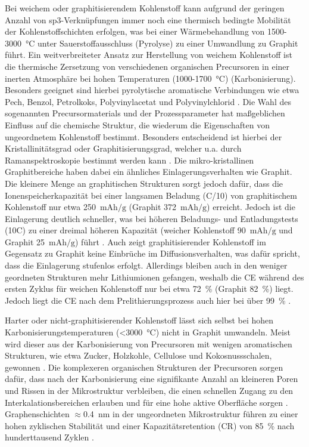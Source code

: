 Bei weichem oder graphitisierendem Kohlenstoff kann aufgrund der geringen Anzahl von sp3-Verknüpfungen immer noch eine thermisch bedingte Mobilität der Kohlenstoffschichten erfolgen, was bei einer Wärmebehandlung von 1500-3000~$\si{\degreeCelsius}$ unter Sauerstoffausschluss (Pyrolyse) zu einer Umwandlung zu Graphit führt. Ein weitverbreiteter Ansatz zur Herstellung von weichem Kohlenstoff ist die thermische Zersetzung von verschiedenen organischen Precursoren in einer inerten Atmosphäre bei hohen Temperaturen (1000-1700~$\si{\degreeCelsius}$) (Karbonisierung). Besonders geeignet sind hierbei pyrolytische aromatische Verbindungen wie etwa Pech, Benzol, Petrolkoks, Polyvinylacetat und Polyvinylchlorid \cite{Wang2021}. Die Wahl des sogenannten Precursormaterials und der Prozessparameter hat maßgeblichen Einfluss auf die chemische Struktur, die wiederum die Eigenschaften von ungeordnetem Kohlenstoff bestimmt. Besonders entscheidend ist hierbei der Kristallinitätsgrad oder Graphitisierungsgrad, welcher u.a. durch Ramanspektroskopie bestimmt werden kann \cite{Yu2014}. Die mikro-kristallinen Graphitbereiche haben dabei ein ähnliches Einlagerungsverhalten wie Graphit. Die kleinere Menge an graphitischen Strukturen sorgt jedoch dafür, dass die Ionenspeicherkapazität bei einer langsamen Beladung (C/10) von graphitischem Kohlenstoff nur etwa 250~$\si{\mA \hour \per \g}$ (Graphit 372~$\si{\mA \hour \per \g}$) erreicht. Jedoch ist die Einlagerung deutlich schneller, was bei höheren Beladungs- und Entladungstests (10C) zu einer dreimal höheren Kapazität (weicher Kohlenstoff 90~$\si{\mA \hour \per \g}$ und Graphit 25~$\si{\mA \hour \per \g}$) führt \cite{Schroeder2014}. Auch zeigt graphitisierender Kohlenstoff im Gegensatz zu Graphit keine Einbrüche im Diffusionsverhalten, was dafür spricht, dass die Einlagerung stufenlos erfolgt. Allerdings bleiben auch in den weniger geordneten Strukturen mehr Lithiumionen gefangen, weshalb die CE während des ersten Zyklus für weichen Kohlenstoff nur bei etwa 72~\% (Graphit 82~\%) liegt. Jedoch liegt die CE nach dem Prelithierungsprozess auch hier bei über 99~\% \cite{Schroeder2014}.

Harter oder nicht-graphitisierender Kohlenstoff lässt sich selbst bei hohen Karbonisierungstemperaturen (<3000~$\si{\degreeCelsius}$) nicht in Graphit umwandeln. Meist wird dieser aus der Karbonisierung von Precursoren mit wenigen aromatischen Strukturen, wie etwa Zucker, Holzkohle, Cellulose und Kokosnussschalen, gewonnen \cite{Wang2021}. Die komplexeren organischen Strukturen der Precursoren sorgen dafür, dass nach der Karbonisierung eine signifikante Anzahl an kleineren Poren und Rissen in der Mikrostruktur verbleiben, die einen schnellen Zugang zu den Interkalationsbereichen erlauben und für eine hohe aktive Oberfläche sorgen \cite{Liu2019a}. Graphenschichten $\approx$0.4~$\si{\nm}$ in der ungeordneten Mikrostruktur führen zu einer hohen zyklischen Stabilität und einer Kapazitätsretention (CR) von 85~\% nach hunderttausend Zyklen \cite{Cao2014}.

